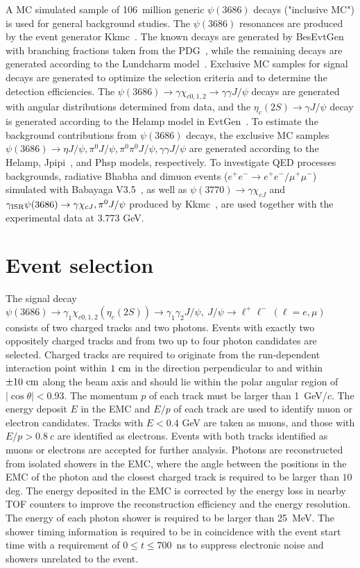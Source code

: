 \documentclass[prd,twocolumn,showpacs,amsmath,amssymb]{revtex4-1}
\begin{document}
A MC simulated sample of 106~million generic $\psi(3686)$ decays ("inclusive MC") is used for general background studies. The
$\psi(3686)$ resonances are produced by the event generator {\sc Kkmc}~\cite{KKMC}. The known decays are generated by {\sc BesEvtGen}~\cite{EvtGen} with
branching fractions taken from the PDG~\cite{PDG}, while the remaining decays are generated according to the {\sc Lundcharm} model~\cite{LundCharm}.
Exclusive MC samples for signal decays are generated to optimize the selection criteria and to determine the detection efficiencies.
The $\psi(3686)\rightarrow\gamma\chi_{c0,1,2}\rightarrow\gamma\gamma J/\psi$ decays are generated with angular distributions determined
from data, and the $\eta_{c}(2S)\rightarrow\gamma J/\psi$ decay is generated according to the {\sc Helamp} model in {\sc EvtGen}~\cite{EvtGen}.
To estimate the background contributions from $\psi(3686)$ decays, the exclusive MC samples $\psi(3686)\to\eta J/\psi, \pi^0 J/\psi,\pi^0\pi^0 J/\psi, \gamma\gamma J/\psi$ are generated according to the {\sc Helamp}, {\sc Jpipi}~\cite{EvtGen}, and {\sc Phsp} models, respectively. To investigate QED processes backgrounds, radiative Bhabha and dimuon events ($e^+e^-\to e^+e^-/\mu^+\mu^-$) simulated with {\sc Babayaga V3.5}~\cite{babayaga}, as well as $\psi(3770)\to\gamma\chi_{cJ}$ and $\gamma_{\rm ISR} \psi(3686)\to\gamma\chi_{cJ},\pi^0 J/\psi$ produced by {\sc Kkmc}~\cite{KKMC}, are used together with the experimental data at 3.773 GeV.

\section{Event selection}

The signal decay $\psi(3686)\rightarrow\gamma_{1}\chi_{c0,1,2}(\eta_{c}(2S))\rightarrow\gamma_1\gamma_{2}J/\psi,~J/\psi\rightarrow \ell^{+}\ell^{-} ~(\ell=e,\mu)$
consists of two charged tracks and two photons. Events with exactly two oppositely charged tracks and from two up to four photon candidates are selected.
Charged tracks are required to originate from the run-dependent interaction point within $1\rm~cm$ in the direction perpendicular to
and within $\pm10\rm~cm$ along the beam axis and should lie within the polar angular region of $|\cos\theta|<0.93$.
The momentum $p$ of each track must be larger than 1~GeV/$c$. The energy deposit $E$ in the EMC and $E/p$ of each track are used to identify muon or electron candidates.
Tracks with $E < 0.4$ GeV are taken as muons, and those with $E/p > 0.8~c$ are identified as electrons. Events with both tracks identified as muons or electrons are accepted for further analysis. Photons are reconstructed from isolated showers in the EMC, where the angle between the positions in the EMC of the
photon and the closest charged track is required to be larger than $10$ deg. The energy deposited in the EMC is corrected by the energy loss in nearby TOF counters to improve the reconstruction efficiency and the
energy resolution.  The energy of each photon shower is required to be larger than 25~MeV.
The shower timing information is required to be in coincidence with the event start time with a requirement of $0 \leq t \leq 700$~ns to suppress electronic noise and showers unrelated to the event.
\end{document}
